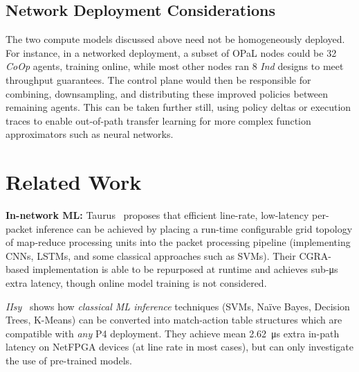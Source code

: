 \documentclass[
sigconf,natbib=false
]{acmart}
\newcommand{\fakepara}[1]{\noindent\textbf{#1:}}
\newcommand{\approachshort}{OPaL}
\newcommand{\Coopfw}{\emph{CoOp}}
\newcommand{\coopfw}{\Coopfw}
\newcommand{\Indfw}{\emph{Ind}}
\newcommand{\indfw}{\Indfw}
\begin{document}

\subsection{Network Deployment Considerations}
The two compute models discussed above need not be homogeneously deployed.
For instance, in a networked deployment, a subset of \approachshort{} nodes could be \SI{32}{\bit} \coopfw{} agents, training online, while most other nodes ran \SI{8}{\bit} \indfw{} designs to meet throughput guarantees.
The control plane would then be responsible for combining, downsampling, and distributing these improved policies between remaining agents.
This can be taken further still, using policy deltas or execution traces to enable out-of-path transfer learning for more complex function approximators such as neural networks.

\section{Related Work}
\fakepara{In-network ML}
Taurus~\parencite{DBLP:journals/corr/abs-2002-08987} proposes that efficient line-rate, low-latency per-packet inference can be achieved by placing a run-time configurable grid topology of map-reduce processing units into the packet processing pipeline (implementing CNNs, LSTMs, and some classical approaches such as SVMs).
Their CGRA-based implementation is able to be repurposed at runtime and achieves sub-\si{\micro\second} extra latency, though online model training is not considered.

\emph{IIsy}~\parencite{DBLP:conf/hotnets/XiongZ19} shows how \emph{classical ML inference} techniques (SVMs, Na\"{i}ve Bayes, Decision Trees, K-Means) can be converted into match-action table structures which are compatible with \emph{any} P4 deployment.
They achieve mean \SI{2.62}{\micro\second} extra in-path latency on NetFPGA devices (at line rate in most cases), but can only investigate the use of pre-trained models.
\end{document}
